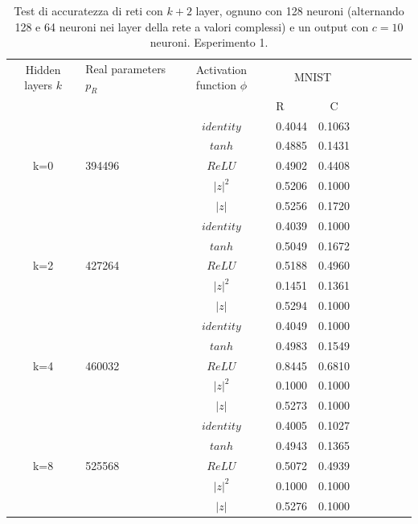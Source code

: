 \documentclass[a4paper,10pt]{article}
\begin{document}
 \begin{table}
  \centering
  \begin{tabular}{cp{} cp{}   cp{} cp{} cp{}}
   \cline{1-5}
   Hidden layers $k$ & Real parameters $p_R$ & Activation function $\phi$ & \multicolumn{2}{c}{MNIST}\\
   \cline{4-5}
   & & & R & C \\
   \cline{1-5}
   & & $identity$ & 0.4044 & 0.1063 \\
   \cline{3-5}
   & & $tanh$ & 0.4885 & 0.1431 \\
   \cline{3-5}
   k=0 & 394496 & $ReLU$ & 0.4902 & 0.4408 \\
   \cline{3-5}
   & & $|z|^2$ & 0.5206 & 0.1000 \\
   \cline{3-5}
   & & $|z|$ & 0.5256 & 0.1720 \\
   \cline{1-5}
  
   & & $identity$ & 0.4039 & 0.1000 \\
   \cline{3-5}
   & & $tanh$ & 0.5049 & 0.1672 \\
   \cline{3-5}
   k=2 & 427264 & $ReLU$ & 0.5188 & 0.4960 \\
   \cline{3-5}
   & & $|z|^2$ & 0.1451 & 0.1361 \\
   \cline{3-5}
   & & $|z|$ & 0.5294 & 0.1000 \\
   \cline{1-5}
  
   & & $identity$ & 0.4049 & 0.1000 \\
   \cline{3-5}
   & & $tanh$ & 0.4983 & 0.1549 \\
   \cline{3-5}
   k=4 & 460032 & $ReLU$ & 0.8445 & 0.6810 \\
   \cline{3-5}
   & & $|z|^2$ & 0.1000 & 0.1000 \\
   \cline{3-5}
   & & $|z|$ & 0.5273 & 0.1000 \\
   \cline{1-5}
   
   & & $identity$ & 0.4005 & 0.1027 \\
   \cline{3-5}
   & & $tanh$ & 0.4943 & 0.1365 \\
   \cline{3-5}
   k=8 & 525568 & $ReLU$ & 0.5072 & 0.4939 \\
   \cline{3-5}
   & & $|z|^2$ & 0.1000 & 0.1000 \\
   \cline{3-5}
   & & $|z|$ & 0.5276 & 0.1000 \\
   \cline{1-5}
  \end{tabular}
  \caption{Test di accuratezza di reti con $k+2$ layer, ognuno con 128 neuroni (alternando 128 e 64 neuroni nei layer della rete a valori complessi) e un output con $c=10$ neuroni. Esperimento 1.}
  \label{CIFAR-101Tab}
 \end{table}
 
\end{document}
